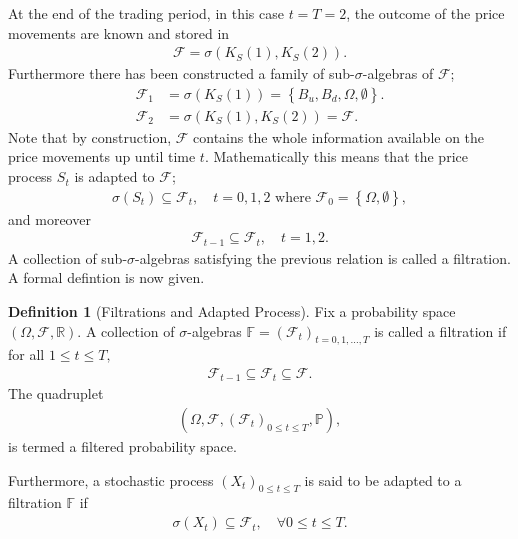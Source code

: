 \documentclass{article}
\theoremstyle{definition}
\newtheorem{definition}[theorem]{Definition}
\numberwithin{equation}{section}
\begin{document}
At the end of the trading period, in this case $t = T = 2$, the outcome of the price movements are known and stored in
\begin{align}
    \mathscr{F} = \sigma\left(K_S(1), K_S(2)\right).
\end{align}
Furthermore there has been constructed a family of sub-$\sigma$-algebras of $\mathscr{F}$;
\begin{align}
    \mathscr{F}_1 &= \sigma(K_S(1)) = \left\{B_u, B_d, \Omega, \emptyset\right\}. \\
    \mathscr{F}_2 &= \sigma(K_S(1), K_S(2)) = \mathscr{F}.
\end{align}
Note that by construction, $\mathscr{F}$ contains the whole information available on the price movements up until time $t$.
Mathematically this means that the price process $S_t$ is adapted to $\mathscr{F}$;
\begin{align}
    \sigma(S_t) \subseteq \mathscr{F}_t, \quad  t = 0,1,2 \text{ where } \mathscr{F}_0 = \left\{ \Omega, \emptyset \right\},
\end{align}
and moreover
\begin{align}
    \mathscr{F}_{t - 1} \subseteq \mathscr{F}_t, \quad t = 1,2.
\end{align}
A collection of sub-$\sigma$-algebras satisfying the previous relation is called a filtration.
A formal defintion is now given.
\begin{definition}[Filtrations and Adapted Process]
    Fix a probability space $(\Omega, \mathscr{F}, \mathbb{R})$.
    A collection of $\sigma$-algebras $\mathbb{F} = \left(\mathscr{F}_t\right)_{t = 0,1,\ldots,T}$ is called a filtration if for all $1 \leq t \leq T,$
    \begin{align}
        \mathscr{F}_{t - 1} \subseteq \mathscr{F}_{t} \subseteq \mathscr{F}.
    \end{align}
    The quadruplet
    \begin{align}
        (\Omega, \mathscr{F}, \left(\mathscr{F}_t\right)_{0 \leq t \leq T}, \mathbb{P}),
    \end{align}
    is termed a filtered probability space.
    
    Furthermore, a stochastic process $(X_t)_{0 \leq t \leq T}$ is said to be adapted to a filtration $\mathbb{F}$ if
    \begin{align}
        \sigma(X_t) \subseteq \mathscr{F}_t, \quad \forall 0 \leq t \leq T.
    \end{align}
\end{definition}
\end{document}
